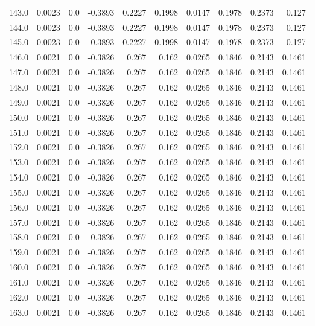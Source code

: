 \begin{longtable}{lrrrrrrrrr}
143.0 & 0.0023 & 0.0 & -0.3893 & 0.2227 & 0.1998 & 0.0147 & 0.1978 & 0.2373 & 0.127 \\
144.0 & 0.0023 & 0.0 & -0.3893 & 0.2227 & 0.1998 & 0.0147 & 0.1978 & 0.2373 & 0.127 \\
145.0 & 0.0023 & 0.0 & -0.3893 & 0.2227 & 0.1998 & 0.0147 & 0.1978 & 0.2373 & 0.127 \\
146.0 & 0.0021 & 0.0 & -0.3826 & 0.267 & 0.162 & 0.0265 & 0.1846 & 0.2143 & 0.1461 \\
147.0 & 0.0021 & 0.0 & -0.3826 & 0.267 & 0.162 & 0.0265 & 0.1846 & 0.2143 & 0.1461 \\
148.0 & 0.0021 & 0.0 & -0.3826 & 0.267 & 0.162 & 0.0265 & 0.1846 & 0.2143 & 0.1461 \\
149.0 & 0.0021 & 0.0 & -0.3826 & 0.267 & 0.162 & 0.0265 & 0.1846 & 0.2143 & 0.1461 \\
150.0 & 0.0021 & 0.0 & -0.3826 & 0.267 & 0.162 & 0.0265 & 0.1846 & 0.2143 & 0.1461 \\
151.0 & 0.0021 & 0.0 & -0.3826 & 0.267 & 0.162 & 0.0265 & 0.1846 & 0.2143 & 0.1461 \\
152.0 & 0.0021 & 0.0 & -0.3826 & 0.267 & 0.162 & 0.0265 & 0.1846 & 0.2143 & 0.1461 \\
153.0 & 0.0021 & 0.0 & -0.3826 & 0.267 & 0.162 & 0.0265 & 0.1846 & 0.2143 & 0.1461 \\
154.0 & 0.0021 & 0.0 & -0.3826 & 0.267 & 0.162 & 0.0265 & 0.1846 & 0.2143 & 0.1461 \\
155.0 & 0.0021 & 0.0 & -0.3826 & 0.267 & 0.162 & 0.0265 & 0.1846 & 0.2143 & 0.1461 \\
156.0 & 0.0021 & 0.0 & -0.3826 & 0.267 & 0.162 & 0.0265 & 0.1846 & 0.2143 & 0.1461 \\
157.0 & 0.0021 & 0.0 & -0.3826 & 0.267 & 0.162 & 0.0265 & 0.1846 & 0.2143 & 0.1461 \\
158.0 & 0.0021 & 0.0 & -0.3826 & 0.267 & 0.162 & 0.0265 & 0.1846 & 0.2143 & 0.1461 \\
159.0 & 0.0021 & 0.0 & -0.3826 & 0.267 & 0.162 & 0.0265 & 0.1846 & 0.2143 & 0.1461 \\
160.0 & 0.0021 & 0.0 & -0.3826 & 0.267 & 0.162 & 0.0265 & 0.1846 & 0.2143 & 0.1461 \\
161.0 & 0.0021 & 0.0 & -0.3826 & 0.267 & 0.162 & 0.0265 & 0.1846 & 0.2143 & 0.1461 \\
162.0 & 0.0021 & 0.0 & -0.3826 & 0.267 & 0.162 & 0.0265 & 0.1846 & 0.2143 & 0.1461 \\
163.0 & 0.0021 & 0.0 & -0.3826 & 0.267 & 0.162 & 0.0265 & 0.1846 & 0.2143 & 0.1461 \\

\end{longtable}
